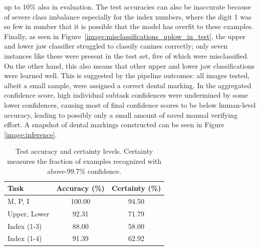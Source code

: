 \documentclass[english,twoside,openright]{UH_DS_MSc}
\begin{document}
up to 10\% also in evaluation. The test accuracies can also be inaccurate because 
of severe class imbalance especially for the index numbers, where the digit 1 was so few
in number that it is possible that the model has overfit to these examples.
Finally, as seen in Figure~\ref{image:misclassifications_uplow_in_test},
the upper and lower jaw classifier struggled to classify canines correctly;
only seven instances like these were present in the test set, five of 
which were misclassified. On the other hand, this also means that other upper 
and lower jaw classifications were learned well. This is suggested by 
the pipeline outcomes: all images tested, albeit a small sample, were 
assigned a correct dental marking. In the aggregated confidence score, 
high individual subtask confidences were undermined by some lower confidences, 
causing most of final confidence scores to be below human-level accuracy, leading 
to possibly only a small amount of saved manual verifying effort. 
A snapshot of dental markings constructed can be seen in Figure \ref{image:inference}.


\begin{table}[h!]
\centering
\begin{tabular}{|l|c|c|}
\hline
\textbf{Task}       & \textbf{Accuracy (\%)} & \textbf{Certainty (\%)} \\ \hline
M, P, I                 & 100.00                 & 94.50                   \\ \hline
Upper, Lower         & 92.31                  & 71.79                   \\ \hline
Index (1-3)                 & 88.00                  & 58.00                    \\ \hline
Index (1-4)                & 91.39                  & 62.92                   \\ \hline
\end{tabular}
\caption{Test accuracy and certainty levels. Certainty measures the fraction of examples recognized with above-99.7\% confidence.}
\label{tab:task_accuracy_certainty}
\end{table}
\end{document}
